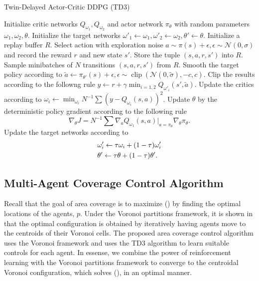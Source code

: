 \documentclass[10pt,conference]{IEEEtran}
\DeclareMathOperator{\Clip}{clip}
\begin{document}
	\begin{algorithm}
		\caption{Twin-Delayed Actor-Critic DDPG (TD3)}
		\begin{algorithmic}[2]
			\STATE Initialize critic networks $Q_{\omega_1}, Q_{\omega_2}$ and actor network $\pi_{\theta}$ with random parameters
			$\omega_1, \omega_2, \theta$. 
			\STATE Initialize the target networks $\omega'_1 \leftarrow \omega_1, \omega'_2 \leftarrow \omega_2, \theta' \leftarrow \theta$.
			\STATE Initialize a replay buffer $R$.
				\STATE Select action with exploration noise $a \sim \pi(s) + \epsilon, \epsilon \sim \mathcal{N}(0, \sigma)$ and record the reward $r$ and new state $s'$. 
				\STATE Store the tuple $(s, a, r, s')$ into $R$. 
				\STATE Sample minibatches of $N$ transitions $(s, a, r, s')$ from $R$.
				\STATE Smooth the target policy according to $\tilde{a} \leftarrow \pi_{\theta'}(s) + \epsilon, \epsilon \sim \Clip(\mathcal{N}(0, \tilde{\sigma}), -c, c)$.
				\STATE Clip the results according to the followng rule $y \leftarrow r + \gamma \min_{i=1,2}Q_{\omega'_i}(s', \tilde{a})$. 
				\STATE Update the critics according to $\omega_i \leftarrow \min_{\omega_i}N^{-1}\sum(y - Q_{\omega_i}(s, a))^2$.
					\STATE Update $\theta$ by the deterministic policy gradient according to the following rule 
					\begin{equation*}
					\displaystyle \nabla_{\theta}J = N^{-1}\sum\nabla_a Q_{\omega_1}(s,a)\big|_{a = \pi_{\theta}}\nabla_{\theta}\pi_{\theta}.
					\end{equation*}
					\STATE Update the target networks according to 
					\begin{align*}
					\displaystyle &\omega'_i \leftarrow \tau\omega_i + (1-\tau)\omega'_i \\
					&\theta' \leftarrow \tau\theta + (1-\tau)\theta'.
					\end{align*}
				\ENDIF 
			\ENDFOR
		\end{algorithmic}
		\label{sacddpg}	
	\end{algorithm}
	\subsection{Multi-Agent Coverage Control Algorithm}
	Recall that the goal of area coverage is to maximize () by finding the optimal locations of the agents, $p$. Under the Voronoi partitions framework, it is shown in \cite{Cortes:2004} that the optimal configuration is obtained by iteratively having agents move to the centroids of their Voronoi cells. The proposed area coverage control algorithm uses the Voronoi framework and uses the TD3 algorithm to learn suitable controls for each agent. In essense, we combine the power of reinforcement learning with the Voronoi partitions framework to converge to the centroidal Voronoi configuration, which solves (), in an optimal manner. 
\end{document}
